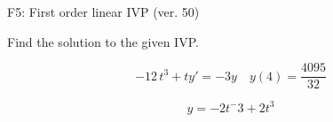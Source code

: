 \begin{exercise}
  \begin{exerciseTitle}F5: First order linear IVP (ver. 50)\end{exerciseTitle}
  \begin{exerciseStatement}
    
Find the solution to the given IVP.

    
\[-12 \, t^{3} +ty'= -3 y \hspace{1em} y( 4 ) = \frac{4095}{32}\]

  \end{exerciseStatement}
  \begin{exerciseAnswer}
    
\[y= -2 t^ -3 +2 t^{3}\]

  \end{exerciseAnswer}
\end{exercise}